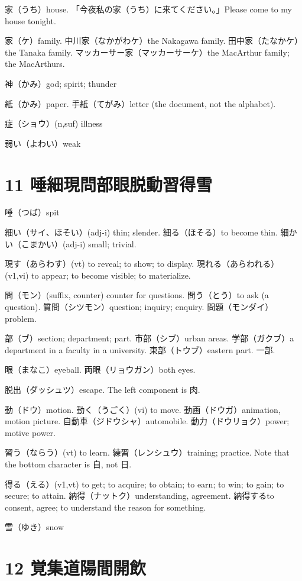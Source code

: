 家（うち）house.
「今夜私の家（うち）に来てください。」Please come to my house tonight.

家（ケ）family.
中川家（なかがわケ）the Nakagawa family.
田中家（たなかケ）the Tanaka family.
マッカーサー家（マッカーサーケ）the MacArthur family; the MacArthurs.

神（かみ）god; spirit; thunder

紙（かみ）paper.
手紙（てがみ）letter (the document, not the alphabet).

症（ショウ）(n,suf) illness

弱い（よわい）weak

\section{11 唾細現問部眼脱動習得雪}

唾（つば）spit

細い（サイ、ほそい）(adj-i) thin; slender.
細る（ほそる）to become thin.
細かい（こまかい）(adj-i) small; trivial.

現す（あらわす）(vt) to reveal; to show; to display.
現れる（あらわれる）(v1,vi) to appear; to become visible; to materialize.

問（モン）(suffix, counter) counter for questions.
問う（とう）to ask (a question).
質問（シツモン）question; inquiry; enquiry.
問題（モンダイ）problem.

部（ブ）section; department; part.
市部（シブ）urban areas.
学部（ガクブ）a department in a faculty in a university.
東部（トウブ）eastern part.
一部.

眼（まなこ）eyeball.
両眼（リョウガン）both eyes.

脱出（ダッシュツ）escape.
The left component is 肉.

動（ドウ）motion.
動く（うごく）(vi) to move.
動画（ドウガ）animation, motion picture.
自動車（ジドウシャ）automobile.
動力（ドウリョク）power; motive power.

習う（ならう）(vt) to learn.
練習（レンシュウ）training; practice.
Note that the bottom character is 自, not 日.

得る（える）(v1,vt) to get; to acquire; to obtain; to earn; to win; to gain; to secure; to attain.
納得（ナットク）understanding, agreement.
納得するto consent, agree; to understand the reason for something.

雪（ゆき）snow

\section{12 覚集道陽間開飲}

